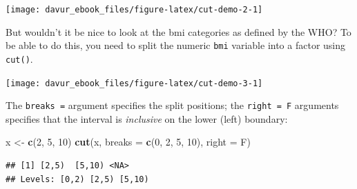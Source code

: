 \documentclass[]{book}
\newenvironment{Shaded}{\begin{snugshade}}{\end{snugshade}}
\newcommand{\DataTypeTok}[1]{\textcolor[rgb]{0.13,0.29,0.53}{#1}}
\newcommand{\DecValTok}[1]{\textcolor[rgb]{0.00,0.00,0.81}{#1}}
\newcommand{\FloatTok}[1]{\textcolor[rgb]{0.00,0.00,0.81}{#1}}
\newcommand{\KeywordTok}[1]{\textcolor[rgb]{0.13,0.29,0.53}{\textbf{#1}}}
\newcommand{\NormalTok}[1]{#1}
\newcommand{\OperatorTok}[1]{\textcolor[rgb]{0.81,0.36,0.00}{\textbf{#1}}}
\newcommand{\OtherTok}[1]{\textcolor[rgb]{0.56,0.35,0.01}{#1}}
\newcommand{\StringTok}[1]{\textcolor[rgb]{0.31,0.60,0.02}{#1}}
\begin{document}
\begin{center}\texttt{[image: davur\_ebook\_files/figure-latex/cut-demo-2-1]} \end{center}

But wouldn't it be nice to look at the bmi categories as defined by the WHO? To be able to do this, you need to split the numeric \texttt{bmi} variable into a factor using \texttt{cut()}.

\begin{Shaded}
\end{Shaded}

\begin{center}\texttt{[image: davur\_ebook\_files/figure-latex/cut-demo-3-1]} \end{center}

The \texttt{breaks\ =} argument specifies the split positions; the \texttt{right\ =\ F} arguments specifies that the interval is \emph{inclusive} on the lower (left) boundary:

\begin{Shaded}
\begin{Highlighting}[]
\NormalTok{x <-}\StringTok{ }\KeywordTok{c}\NormalTok{(}\DecValTok{2}\NormalTok{, }\DecValTok{5}\NormalTok{, }\DecValTok{10}\NormalTok{)}
\KeywordTok{cut}\NormalTok{(x, }\DataTypeTok{breaks =} \KeywordTok{c}\NormalTok{(}\DecValTok{0}\NormalTok{, }\DecValTok{2}\NormalTok{, }\DecValTok{5}\NormalTok{, }\DecValTok{10}\NormalTok{), }\DataTypeTok{right =}\NormalTok{ F)}
\end{Highlighting}
\end{Shaded}

\begin{verbatim}
## [1] [2,5)  [5,10) <NA>  
## Levels: [0,2) [2,5) [5,10)
\end{verbatim}
\end{document}
